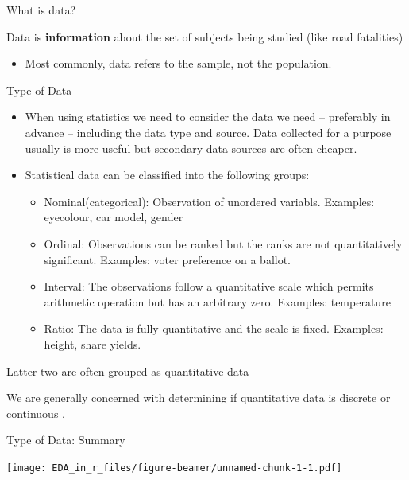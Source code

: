 \documentclass[ignorenonframetext,]{beamer}
\providecommand{\tightlist}{%
  \setlength{\itemsep}{0pt}\setlength{\parskip}{0pt}}
\begin{document}
\begin{frame}{What is data?}

Data is \textbf{information} about the set of subjects being studied
(like road fatalities)

\begin{itemize}
\tightlist
\item
  Most commonly, data refers to the sample, not the population.
\end{itemize}

\end{frame}

\begin{frame}{Type of Data}

\begin{itemize}
\item
  When using statistics we need to consider the data we need --
  preferably in advance -- including the data type and source. Data
  collected for a purpose usually is more useful but secondary data
  sources are often cheaper.
\item
  Statistical data can be classified into the following groups:

  \begin{itemize}
  \item
    Nominal(categorical): Observation of unordered variabls. Examples:
    eyecolour, car model, gender
  \item
    Ordinal: Observations can be ranked but the ranks are not
    quantitatively significant. Examples: voter preference on a ballot.
  \item
    Interval: The observations follow a quantitative scale which permits
    arithmetic operation but has an arbitrary zero. Examples:
    temperature
  \item
    Ratio: The data is fully quantitative and the scale is fixed.
    Examples: height, share yields.
  \end{itemize}
\end{itemize}

Latter two are often grouped as quantitative data

We are generally concerned with determining if quantitative data is
{discrete} or {continuous }.

\end{frame}

\begin{frame}{Type of Data: Summary}

\texttt{[image: EDA\_in\_r\_files/figure-beamer/unnamed-chunk-1-1.pdf]}

\end{frame}
\end{document}
